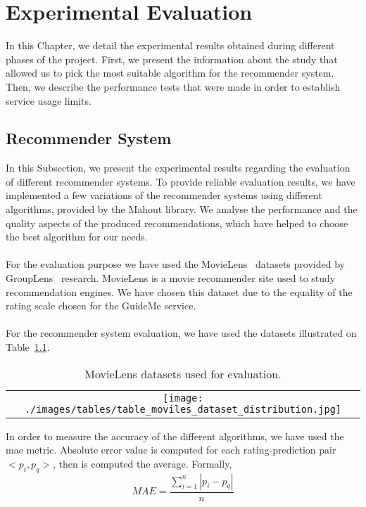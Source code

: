\chapter{Experimental Evaluation}
\label{chapter:expRsults}
In this Chapter, we detail the experimental results obtained during different phases of the project. First, we present the information about the study that allowed us to pick the most suitable algorithm for the recommender system. Then, we describe the performance tests that were made in order to establish service usage limits.

\section{Recommender System}
\label{subsec:expRsults}
In this Subsection, we present the experimental results regarding the evaluation of different recommender systems. To provide reliable evaluation results, we have implemented a few variations of the recommender systems using different algorithms, provided by the Mahout library. We analyse the performance and the quality aspects of the produced recommendations, which have helped to choose the best algorithm for our needs.\\
\\
For the evaluation purpose we have used the MovieLens~\cite{movieLens} datasets provided by GroupLens~\cite{gourpLens} research. MovieLens is a movie recommender site used to study recommendation engines. We have chosen this dataset due to the equality of the rating scale chosen for the GuideMe service.\\
\\
For the recommender system evaluation, we have used the datasets illustrated on Table~\ref{tab:DatasetSize}.
\begin{center}
\begin{table}
	\centering
    \caption{MovieLens datasets used for evaluation.}
    \label{tab:DatasetSize}
    \begin{tabular}{c}
	\texttt{[image: ./images/tables/table\_moviles\_dataset\_distribution.jpg]}    
    \end{tabular}
    \end{table}
\end{center}
In order to measure the accuracy of the different algorithms, we have used the \gls{mae} metric. Absolute error value is computed for each rating-prediction pair $<p_i, p_q>$, then is computed the average. Formally, 
\begin{equation}
MAE=\frac{\sum_{i=1}^{n} | p_i - p_q|}{n}
\end{equation}
